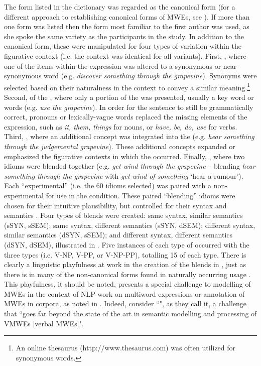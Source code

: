 \documentclass[output=paper
,modfonts
,nonflat]{langsci/langscibook}
\begin{document}
The form listed in the dictionary was regarded as the canonical form (for a different approach to establishing canonical forms of MWEs, see ). If more than one form was listed then the form most familiar to the first author was used, as she spoke the same variety as the participants in the study. In addition to the canonical form, these  were manipulated for four types of variation  within the figurative context (i.e. the context was identical for all variants). First, , where one of the  items within the expression was altered to a synonymous or near-synonymous word (e.g. \textit{discover something through the grapevine}). Synonyms were selected based on their naturalness in the context to convey a similar meaning.\footnote{An online thesaurus (http://www.thesaurus.com) was often utilized for synonymous words.} Second,  of the , where only a portion of the  was presented, usually a key word or words (e.g. \textit{use the grapevine}). In order for the sentence to still be grammatically correct, pronouns or lexically-vague words replaced the missing elements of the expression, such as \textit{it, them, things} for nouns, or \textit{have, be, do, use} for verbs. Third, , where an additional concept was integrated into the  (e.g. \textit{hear something through the judgemental grapevine}). These additional concepts expanded or emphasized the figurative contexts in which the  occurred. Finally, , where two idioms were blended together (e.g. \textit{get wind through the grapevine} -- blending \textit{hear something through the grapevine} with \textit{get wind of something} `hear a rumour'). Each ``experimental''  (i.e. the 60 idioms selected) was paired with a non-experimental  for use in the   condition. These paired ``blending'' idioms were chosen for their intuitive plausibility, but controlled for their syntax and semantics \citep{CuttingBock1997}. Four types of blends were created: same syntax, similar semantics (sSYN, sSEM); same syntax, different semantics (sSYN, dSEM); different syntax, similar semantics (dSYN, sSEM); and different syntax, different semantics (dSYN, dSEM), illustrated in . Five instances of each type of  occurred with the three  types (i.e. V-NP, V-PP, or V-NP-PP), totalling 15 of each  type. There is clearly a linguistic playfulness at work in the creation of the  blends  in , just as there is in many of the non-canonical  forms found in naturally occurring usage \citep[cf.][]{Moon1998,Duffley2013}. This playfulness, it should be noted, presents a special challenge to modelling of MWEs in the context of NLP work on multiword expressions  or annotation of MWEs in corpora, as noted in . Indeed,  consider ``", as they call it, a challenge that ``goes far beyond the state of the art in semantic modelling and processing of VMWEs [verbal MWEs]".
\end{document}
